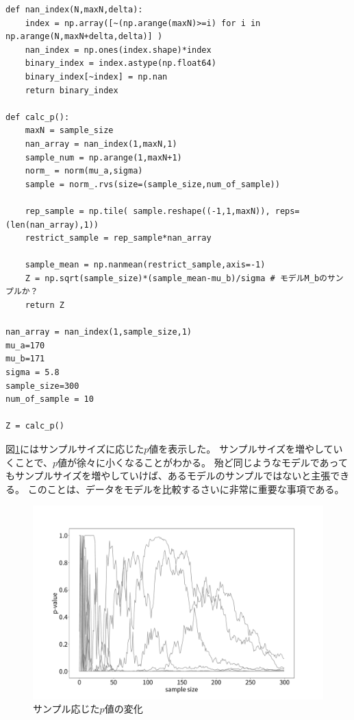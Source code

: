 \begin{lstlisting}
def nan_index(N,maxN,delta):
    index = np.array([~(np.arange(maxN)>=i) for i in np.arange(N,maxN+delta,delta)] )
    nan_index = np.ones(index.shape)*index
    binary_index = index.astype(np.float64)
    binary_index[~index] = np.nan
    return binary_index

def calc_p():
    maxN = sample_size
    nan_array = nan_index(1,maxN,1)
    sample_num = np.arange(1,maxN+1)
    norm_ = norm(mu_a,sigma)
    sample = norm_.rvs(size=(sample_size,num_of_sample))

    rep_sample = np.tile( sample.reshape((-1,1,maxN)), reps= (len(nan_array),1))
    restrict_sample = rep_sample*nan_array

    sample_mean = np.nanmean(restrict_sample,axis=-1)
    Z = np.sqrt(sample_size)*(sample_mean-mu_b)/sigma # モデルM_bのサンプルか？
    return Z

nan_array = nan_index(1,sample_size,1)
mu_a=170
mu_b=171
sigma = 5.8
sample_size=300
num_of_sample = 10

Z = calc_p()
\end{lstlisting}

図\ref{fig:time_series_p_value_depends_sample_size}にはサンプルサイズに応じた$p$値を表示した。
サンプルサイズを増やしていくことで、$p$値が徐々に小くなることがわかる。
殆ど同じようなモデルであってもサンプルサイズを増やしていけば、あるモデルのサンプルではないと主張できる。
このことは、データをモデルを比較するさいに非常に重要な事項である。
\begin{figure}
 \begin{center}
  \includegraphics[width=15cm]{./image/04_/p_sample_size.pdf}
  \caption{サンプル応じた$p$値の変化}
  \label{fig:time_series_p_value_depends_sample_size}
 \end{center}
\end{figure}



